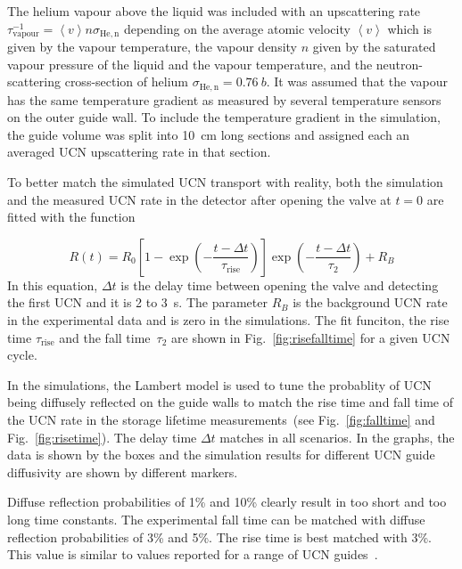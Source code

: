 The helium vapour above the liquid was included with an upscattering
rate
$\tau^{-1}_\mathrm{vapour} = \left< v \right> n \sigma_\mathrm{He,n}$
depending on the average atomic velocity $\left < v \right>$ which is
given by the vapour temperature, the vapour density $n$ given by the
saturated vapour pressure of the liquid and the vapour temperature,
and the neutron-scattering cross-section of helium
$\sigma_\mathrm{He,n} = 0.76~b$. It was assumed that the vapour has
the same temperature gradient as measured by several temperature
sensors on the outer guide wall. To include the temperature gradient
in the simulation, the guide volume was split into 10~cm long sections
and assigned each an averaged UCN upscattering rate in that section.

To better match the simulated UCN transport with reality, both the
simulation and the measured UCN rate in the detector after opening the
valve at $t=0$ are fitted with the function

\begin{equation}
R(t) = R_0 \left[ 1 - \exp \left( -\frac{t - \Delta t}{\tau_\mathrm{rise}} \right) \right] \exp \left( -\frac{t - \Delta t}{\tau_2} \right) + R_B
\end{equation}
In this equation, $\Delta t$ is the delay time between opening the
valve and detecting the first UCN and it is 2 to 3~s. The parameter
$ R_B$ is the background UCN rate in the experimental data and is zero
in the simulations.  The fit funciton, the rise time
$\tau_{\mathrm{rise}}$ and the fall time~$\tau_2$ are shown in
Fig.~\ref{fig:risefalltime} for a given UCN cycle.

In the simulations, the Lambert model is used to tune the probablity
of UCN being diffusely reflected on the guide walls to match the rise
time and fall time of the UCN rate in the storage lifetime
measurements~(see Fig.~\ref{fig:falltime} and
Fig.~\ref{fig:risetime}).  The delay time $\Delta t$ matches in all
scenarios.  In the graphs, the data is shown by the boxes and the
simulation results for different UCN guide diffusivity are shown by
different markers.

Diffuse reflection probabilities of 1\% and 10\% clearly result in too
short and too long time constants. The experimental fall time can be
matched with diffuse reflection probabilities of 3\% and 5\%. The rise
time is best matched with 3\%. This value is similar to values
reported for a range of UCN
guides~\cite{DAUM201471,Wlokka2017,Atchison2010}.


